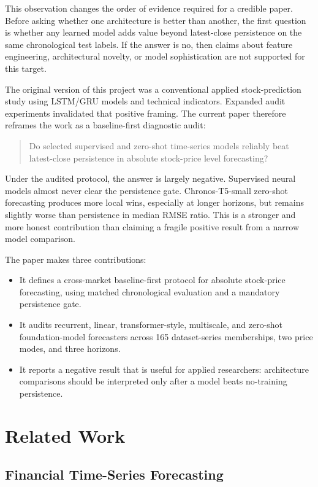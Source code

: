 \documentclass[11pt]{article}
\begin{document}
This observation changes the order of evidence required for a credible paper. Before asking whether one architecture is better than another, the first question is whether any learned model adds value beyond latest-close persistence on the same chronological test labels. If the answer is no, then claims about feature engineering, architectural novelty, or model sophistication are not supported for this target.

The original version of this project was a conventional applied stock-prediction study using LSTM/GRU models and technical indicators. Expanded audit experiments invalidated that positive framing. The current paper therefore reframes the work as a baseline-first diagnostic audit:

\begin{quote}
Do selected supervised and zero-shot time-series models reliably beat latest-close persistence in absolute stock-price level forecasting?
\end{quote}

Under the audited protocol, the answer is largely negative. Supervised neural models almost never clear the persistence gate. Chronos-T5-small zero-shot forecasting produces more local wins, especially at longer horizons, but remains slightly worse than persistence in median RMSE ratio. This is a stronger and more honest contribution than claiming a fragile positive result from a narrow model comparison.

The paper makes three contributions:
\begin{itemize}
\item It defines a cross-market baseline-first protocol for absolute stock-price forecasting, using matched chronological evaluation and a mandatory persistence gate.
\item It audits recurrent, linear, transformer-style, multiscale, and zero-shot foundation-model forecasters across 165 dataset-series memberships, two price modes, and three horizons.
\item It reports a negative result that is useful for applied researchers: architecture comparisons should be interpreted only after a model beats no-training persistence.
\end{itemize}

\section{Related Work}

\subsection{Financial Time-Series Forecasting}
\end{document}

